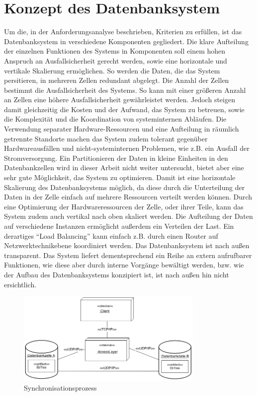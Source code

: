 \documentclass[a4paper,11pt,oneside,%
headsepline,												%
footsepline,												%
bibtotocnumbered									%
]{scrreprt}
\begin{document}
\section{Konzept des Datenbanksystem}
\label{sec:DBSystemConcept} 
Um die, in der Anforderungsanalyse beschrieben, Kriterien zu erfüllen, ist das Datenbanksystem  in verschiedene Komponenten gegliedert. Die klare Aufteilung der einzelnen Funktionen des Systems in Komponenten soll einem hohen Anspruch an Ausfallsicherheit gerecht werden, sowie eine horizontale und vertikale Skalierung ermöglichen. So werden die Daten, die das System persitieren, in mehreren Zellen redundant abgelegt. Die Anzahl der Zellen bestimmt die Ausfallsicherheit des Systems. So kann mit einer größeren Anzahl an Zellen eine höhere Ausfallsicherheit gewährleistet werden. Jedoch steigen damit gleichzeitig die Kosten und der Aufwand, das System zu betreuen, sowie die Komplexität und die Koordination von systeminternen Abläufen. Die Verwendung separater Hardware-Ressourcen und eine Aufteilung in räumlich getrennte Standorte machen das System zudem tolerant gegenüber Hardwareausfällen und nicht-systeminternen Problemen, wie z.B. ein Ausfall der Stromversorgung. Ein Partitionieren der Daten in kleine Einheiten in den Datenbankzellen wird in dieser Arbeit nicht weiter untersucht, bietet aber eine sehr gute Möglichkeit, das System zu optimieren. Damit ist eine horizontale Skalierung des Datenbanksystems möglich, da diese durch die Unterteilung der Daten in der Zelle einfach auf mehrere Ressourcen verteilt werden können. Durch eine Optimierung der Hardwareressourcen der Zelle, oder ihrer Teile, kann das System zudem auch vertikal nach oben skaliert werden. Die Aufteilung der Daten auf verschiedene Instanzen ermöglicht außerdem  ein Verteilen der Last. Ein derartiges \enquote{Load Balancing} kann einfach z.B. durch einen Router auf Netzwerktechnikebene koordiniert werden. Das Datenbanksystem ist nach außen transparent. Das System liefert dementsprechend ein Reihe an extern aufrufbarer Funktionen, wie diese aber durch interne Vorgänge bewältigt werden, bzw. wie der Aufbau des Datenbanksystems konzipiert ist, ist nach außen hin nicht ersichtlich.
\begin{figure}[h!]
        \centering
    \includegraphics[width=0.8\textwidth]{bilder/uml_deployment_dia.png}
    \caption{Synchronisationsprozess}
\end{figure}
\end{document}
